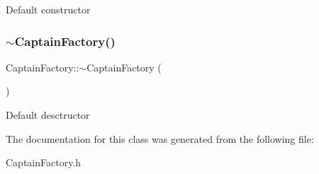 Default constructor \mbox{\label{classCaptainFactory_a1ffe5cdefdefcb36f4c362990dd61080}} 
\subsubsection{\texorpdfstring{$\sim$\+Captain\+Factory()}{~CaptainFactory()}}
{\footnotesize\ttfamily Captain\+Factory\+::$\sim$\+Captain\+Factory (\begin{DoxyParamCaption}{ }\end{DoxyParamCaption})}

Default desctructor 

The documentation for this class was generated from the following file\+:\begin{DoxyCompactItemize}
\item 
Captain\+Factory.\+h\end{DoxyCompactItemize}
